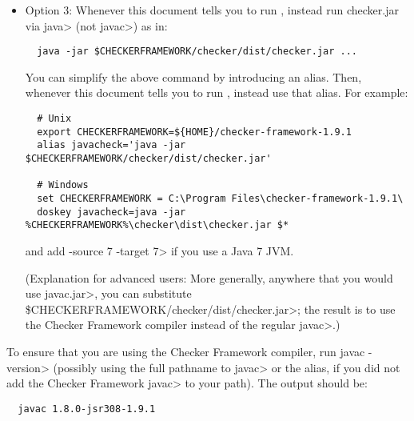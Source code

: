 \begin{itemize}
   \item
   Option 3:
   Whenever this document tells you to run , instead
   run checker.jar via \<java> (not \<javac>) as in:

\begin{Verbatim}
  java -jar $CHECKERFRAMEWORK/checker/dist/checker.jar ...
\end{Verbatim}

    You can simplify the above command by introducing an alias.  Then,
    whenever this document tells you to run , instead use that
    alias.  For example:

\begin{Verbatim}
  # Unix
  export CHECKERFRAMEWORK=${HOME}/checker-framework-1.9.1
  alias javacheck='java -jar $CHECKERFRAMEWORK/checker/dist/checker.jar'

  # Windows
  set CHECKERFRAMEWORK = C:\Program Files\checker-framework-1.9.1\
  doskey javacheck=java -jar %CHECKERFRAMEWORK%\checker\dist\checker.jar $*
\end{Verbatim}

   \noindent
   and add \<-source 7 -target 7> if you use a Java 7 JVM.

   (Explanation for advanced users:  More generally, anywhere that you would use \<javac.jar>, you can substitute
   \<\$CHECKERFRAMEWORK/checker/dist/checker.jar>; 
   the result is to use the Checker
   Framework compiler instead of the regular \<javac>.)

\end{itemize}


To ensure that you are using the Checker Framework compiler, run
\<javac -version> (possibly using the
full pathname to \<javac> or the alias, if you did not add the Checker
Framework \<javac> to your path).
The output should be:

\begin{Verbatim}
  javac 1.8.0-jsr308-1.9.1
\end{Verbatim}




